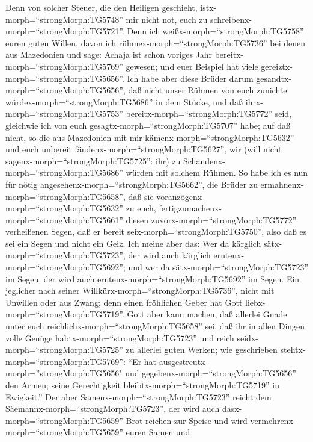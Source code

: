  Denn von solcher Steuer, die den Heiligen geschieht,
istx-morph=``strongMorph:TG5748'' mir nicht not, euch zu
schreibenx-morph=``strongMorph:TG5721''.  Denn ich
weißx-morph=``strongMorph:TG5758'' euren guten Willen, davon ich
rühmex-morph=``strongMorph:TG5736'' bei denen aus Mazedonien und sage:
Achaja ist schon voriges Jahr bereitx-morph=``strongMorph:TG5769''
gewesen; und euer Beispiel hat viele
gereiztx-morph=``strongMorph:TG5656''.  Ich habe aber diese
Brüder darum gesandtx-morph=``strongMorph:TG5656'', daß nicht unser
Rühmen von euch zunichte würdex-morph=``strongMorph:TG5686'' in dem
Stücke, und daß ihrx-morph=``strongMorph:TG5753''
bereitx-morph=``strongMorph:TG5772'' seid, gleichwie ich von euch
gesagtx-morph=``strongMorph:TG5707'' habe;  auf daß nicht,
so die aus Mazedonien mit mir kämenx-morph=``strongMorph:TG5632'' und
euch unbereit fändenx-morph=``strongMorph:TG5627'', wir (will nicht
sagenx-morph=``strongMorph:TG5725'': ihr) zu
Schandenx-morph=``strongMorph:TG5686'' würden mit solchem Rühmen.
 So habe ich es nun für nötig
angesehenx-morph=``strongMorph:TG5662'', die Brüder zu
ermahnenx-morph=``strongMorph:TG5658'', daß sie
voranzögenx-morph=``strongMorph:TG5632'' zu euch,
fertigzumachenx-morph=``strongMorph:TG5661'' diesen
zuvorx-morph=``strongMorph:TG5772'' verheißenen Segen, daß er bereit
seix-morph=``strongMorph:TG5750'', also daß es sei ein Segen und nicht
ein Geiz.  Ich meine aber das: Wer da kärglich
sätx-morph=``strongMorph:TG5723'', der wird auch kärglich
erntenx-morph=``strongMorph:TG5692''; und wer da
sätx-morph=``strongMorph:TG5723'' im Segen, der wird auch
erntenx-morph=``strongMorph:TG5692'' im Segen.  Ein
jeglicher nach seiner Willkürx-morph=``strongMorph:TG5736'', nicht mit
Unwillen oder aus Zwang; denn einen fröhlichen Geber hat Gott
liebx-morph=``strongMorph:TG5719''.  Gott aber kann machen,
daß allerlei Gnade unter euch reichlichx-morph=``strongMorph:TG5658''
sei, daß ihr in allen Dingen volle Genüge
habtx-morph=``strongMorph:TG5723'' und reich
seidx-morph=``strongMorph:TG5725'' zu allerlei guten Werken;
 wie geschrieben stehtx-morph=``strongMorph:TG5769'': ``Er
hat ausgestreutx-morph=''strongMorph:TG5656" und
gegebenx-morph=``strongMorph:TG5656'' den Armen; seine Gerechtigkeit
bleibtx-morph=``strongMorph:TG5719'' in Ewigkeit.''  Der
aber Samenx-morph=``strongMorph:TG5723'' reicht dem
Säemannx-morph=``strongMorph:TG5723'', der wird auch
dasx-morph=``strongMorph:TG5659'' Brot reichen zur Speise und wird
vermehrenx-morph=``strongMorph:TG5659'' euren Samen und
